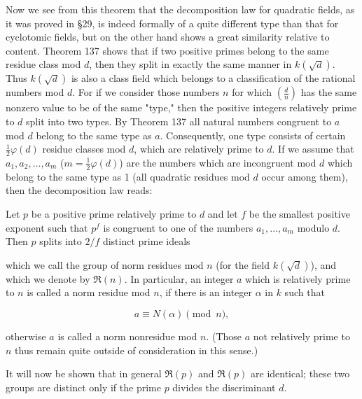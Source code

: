Now we see from this theorem that the decomposition law for quadratic fields, as it was proved in §29, is indeed formally of a quite different type than that for cyclotomic fields, but on the other hand shows a great similarity relative to content. Theorem 137 shows that if two positive primes belong to the same residue class mod $d$, then they split in exactly the same manner in $k(\sqrt{d})$. Thus $k(\sqrt{d})$ is also a class field which belongs to a classification of the rational numbers mod $d$. For if we consider those numbers $n$ for which $\left( \frac{d}{n} \right)$ has the same nonzero value to be of the same "type," then the positive integers relatively prime to $d$ split into two types. By Theorem 137 all natural numbers congruent to $a$ mod $d$ belong to the same type as $a$. Consequently, one type consists of certain $\frac{1}{2}\varphi(d)$ residue classes mod $d$, which are relatively prime to $d$. If we assume that $a_1, a_2, \ldots, a_m$ ($m = \frac{1}{2}\varphi(d)$) are the numbers which are incongruent mod $d$ which belong to the same type as 1 (all quadratic residues mod $d$ occur among them), then the decomposition law reads:

Let $p$ be a positive prime relatively prime to $d$ and let $f$ be the smallest positive exponent such that $p^f$ is congruent to one of the numbers $a_1, \ldots, a_m$ modulo $d$. Then $p$ splits into $2/f$ distinct prime ideals

which we call the group of norm residues mod $n$ (for the field $k(\sqrt{d})$), and which we denote by $\mathfrak{R}(n)$. In particular, an integer $a$ which is relatively prime to $n$ is called a norm residue mod $n$, if there is an integer $\alpha$ in $k$ such that

$$a \equiv N(\alpha) \pmod{n},$$

otherwise $a$ is called a norm nonresidue mod $n$. (Those $a$ not relatively prime to $n$ thus remain quite outside of consideration in this sense.)

It will now be shown that in general $\mathfrak{R}(p)$ and $\mathfrak{R}(p)$ are identical; these two groups are distinct only if the prime $p$ divides the discriminant $d$.
